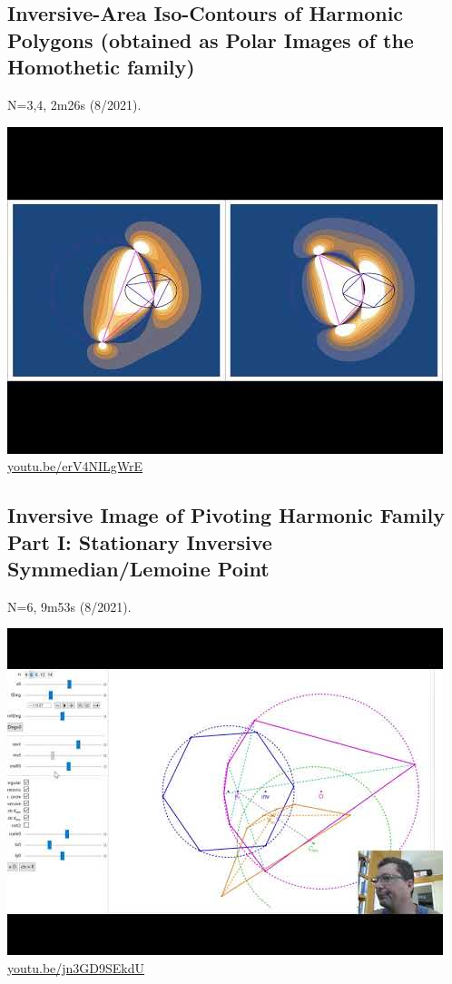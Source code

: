 \documentclass[12pt]{amsart}
\begin{document}
\subsection{Inversive-Area Iso-Contours of Harmonic Polygons (obtained as Polar Images of the Homothetic family)}
\label{vid:erV4NILgWrE}
\noindent N=3,4, 2m26s (8/2021). 
\begin{center}\includegraphics[width=.5\textwidth]{pics/erV4NILgWrE.jpg} \\ 
\href{https://youtu.be/erV4NILgWrE}{\url{youtu.be/erV4NILgWrE}}\end{center}
% 

\subsection{Inversive Image of Pivoting Harmonic Family Part I: Stationary Inversive Symmedian/Lemoine Point}
\label{vid:jn3GD9SEkdU}
\noindent N=6, 9m53s (8/2021). 
\begin{center}\includegraphics[width=.5\textwidth]{pics/jn3GD9SEkdU.jpg} \\ 
\href{https://youtu.be/jn3GD9SEkdU}{\url{youtu.be/jn3GD9SEkdU}}\end{center}
% 
\end{document}

